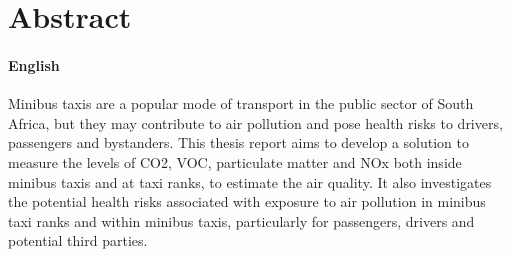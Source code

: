 \chapter*{Abstract}
\makeatletter{}\makeatother

\subsubsection*{English}

Minibus taxis are a popular mode of transport in the public sector of South Africa, but they may contribute to air pollution and pose health risks to drivers, passengers and bystanders. This thesis report aims to develop a solution to measure the levels of CO2, VOC, particulate matter and NOx both inside minibus taxis and at taxi ranks, to estimate the air quality.
It also investigates the potential health risks associated with exposure to air pollution in minibus taxi ranks and within minibus taxis, particularly for passengers, drivers and potential third parties.



